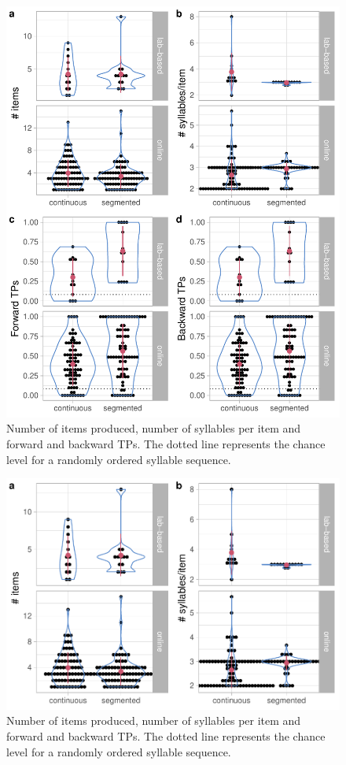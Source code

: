 \documentclass[
]{article}
\begin{document}
\begin{figure}

{\centering \includegraphics[width=0.8\linewidth]{segmentation_recall_combined_for_revision2_files/figure-latex/recall-general-measures-tp-plot-1} 

}

\caption{Number of items produced, number of syllables per item and forward and backward TPs. The dotted line represents the chance level for a randomly ordered syllable sequence.}\label{fig:recall-general-measures-tp-plot}
\end{figure}

\begin{figure}

{\centering \includegraphics[width=0.8\linewidth]{segmentation_recall_combined_for_revision2_files/figure-latex/recall-general-measures-tp-plot-n-items-sylls-1} 

}

\caption{Number of items produced, number of syllables per item and forward and backward TPs. The dotted line represents the chance level for a randomly ordered syllable sequence.}\label{fig:recall-general-measures-tp-plot-n-items-sylls}
\end{figure}
\end{document}
